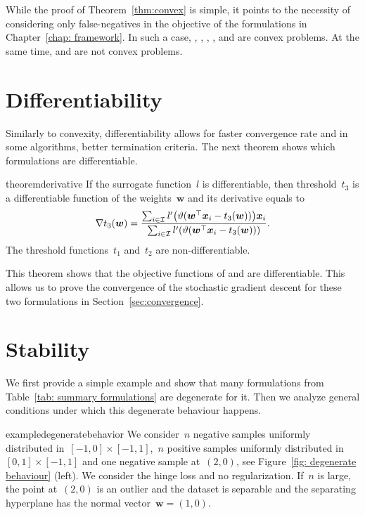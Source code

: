\noindent While the proof of Theorem~\ref{thm:convex} is simple, it points to the necessity of considering only false-negatives in the objective of the formulations in Chapter~\ref{chap: framework}. In such a case, \TopPush, \TopPushK, \TopMeanK, \tauFPL, \PatMat and \PatMatNP are convex problems. At the same time, \Grill and \GrillNP are not convex problems.

\section{Differentiability}

Similarly to convexity, differentiability allows for faster convergence rate and in some algorithms, better termination criteria. The next theorem shows which formulations are differentiable.

\pagebreak

\begin{restatable}{theorem}{derivative}\label{thm:derivative}
  If the surrogate function~$l$ is differentiable, then threshold~$t_3$ is a differentiable function of the weights~$\bm{w}$ and its derivative equals to
  \begin{equation*}
    \nabla t_3(\bm{w}) = \frac{\sum_{i \in \I} l'\Brac{\vartheta(\bm{w}^{\top} \bm{x}_i - t_3(\bm{w}))}\bm{x}_i}{\sum_{i \in \I}l'\Brac{\vartheta(\bm{w}^{\top} \bm{x}_i - t_3(\bm{w}))}}.
  \end{equation*}
  The threshold functions~$t_1$ and~$t_2$ are non-differentiable.
\end{restatable}

\noindent This theorem shows that the objective functions of \PatMat and \PatMatNP are differentiable. This allows us to prove the convergence of the stochastic gradient descent for these two formulations in Section~\ref{sec:convergence}.

\section{Stability}\label{sec: stability}

We first provide a simple example and show that many formulations from Table~\ref{tab: summary formulations} are degenerate for it. Then we analyze general conditions under which this degenerate behaviour happens.

\begin{restatable}{example}{degeneratebehavior}\label{ex: degenerate behaviour}
  We consider~$n$ negative samples uniformly distributed in~$[-1,0]\times[-1,1]$,~$n$ positive samples uniformly distributed in~$[0,1]\times[-1,1]$ and one negative sample at~$(2,0)$, see Figure~\ref{fig: degenerate behaviour} (left). We consider the hinge loss and no regularization. If~$n$ is large, the point at~$(2,0)$ is an outlier and the dataset is separable and the separating hyperplane has the normal vector~$\bm{w}=(1,0)$. 
\end{restatable}

